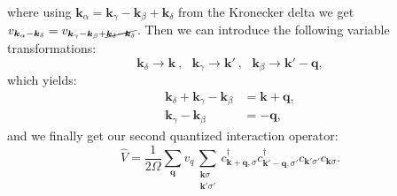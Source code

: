 \documentclass[../main.tex]{subfile}
\begin{document}
where using $\bm{k}_{\alpha} = \bm{k}_{\gamma}-\bm{k}_{\beta} + \bm{k}_{\delta}$ from the Kronecker delta we get $v_{\bm{k}_{\alpha}- \bm{k}_{\delta}} = v_{\bm{k}_{\gamma}-\bm{k}_{\beta} + \cancel{\bm{k}_{\delta}-\bm{k}_{\delta}}}$.
Then we can introduce the following variable transformations:
\[
    \bm{k}_{\delta} \rightarrow \bm{k} ~,~~~ \bm{k}_{\gamma} \rightarrow \bm{k}' ~,~~~ \bm{k}_{\beta} \rightarrow \bm{k}' - \bm{q},
\]
which yields:
\begin{align*}
    \bm{k}_{\delta} + \bm{k}_{\gamma} - \bm{k}_{\beta} &= \bm{k}+ \bm{q},\\
    \bm{k}_{\gamma} - \bm{k}_{\beta} &=  -\bm{q},
\end{align*}
and we finally get our second quantized interaction operator:
\[
    \hat{V} = \frac{1}{2\Omega} \sum_{\bm{q}}v_{q} \sum_{\substack{\bm{k}\sigma\\\bm{k}'\sigma'}} c^{\dagger}_{\bm{k}+\bm{q},\sigma}c^{\dagger}_{\bm{k}'-\bm{q},\sigma'}c_{\bm{k}'\sigma'}c_{\bm{k}\sigma}.
\]
\end{document}
